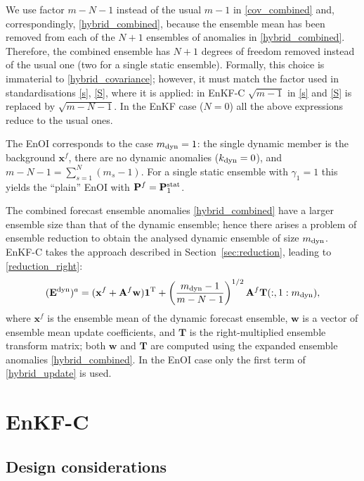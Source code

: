 \documentclass[11pt]{report}
\newcommand{\mb} {\mathbf}
\newcommand{\T}{^{\tiny \mathrm T}}
\newcommand*\suptxt[1]{^{\textnormal{#1}}}
\newcommand*\subtxt[1]{_{\textnormal{#1}}}
\begin{document}
We use factor $m - N - 1$ instead of the usual $m - 1$ in \eqref{cov_combined} and, correspondingly, \eqref{hybrid_combined}, because the ensemble mean has been removed from each of the $N + 1$ ensembles of anomalies in \eqref{hybrid_combined}.
Therefore, the combined ensemble has $N + 1$ degrees of freedom removed instead of the usual one (two for a single static ensemble).
Formally, this choice is immaterial to \eqref{hybrid_covariance}; however, it must match the factor used in standardisations \eqref{s}, \eqref{S}, where it is applied: in EnKF-C $\sqrt{m - 1}$ in \eqref{s} and \eqref{S} is replaced by $\sqrt{m - N - 1}$.
In the EnKF case ($N = 0$) all the above expressions reduce to the usual ones.

The EnOI corresponds to the case $m\subtxt{dyn} = 1$: the single dynamic member is the background $\mb x^f$, there are no dynamic anomalies ($k\subtxt{dyn} = 0$), and $m - N - 1 = \sum_{s=1}^N (m_s - 1)$.
For a single static ensemble with $\gamma_1 = 1$ this yields the ``plain'' EnOI with $\mb P^f = \mb P\suptxt{stat}_1$.

The combined forecast ensemble anomalies \eqref{hybrid_combined} have a larger ensemble size than that of the dynamic ensemble; hence there arises a problem of ensemble reduction to obtain the analysed dynamic ensemble of size $m\subtxt{dyn}$.
EnKF-C takes the approach described in Section~\ref{sec:reduction}, leading to \eqref{reduction_right}:
\begin{align}
  \label{hybrid_update}
  (\mb E\suptxt{dyn})^a = (\mb x^f + \mb A^f \mb w) \mb 1\T + \left(\frac{m\subtxt{dyn} - 1}{m - N - 1}\right)^{1/2} \mb A^f \mb T(:, 1 : m\subtxt{dyn}),
\end{align}
where $\mb x^f$ is the ensemble mean of the dynamic forecast ensemble, $\mb w$ is a vector of ensemble mean update coefficients, and $\mb T$ is the right-multiplied ensemble transform matrix; both $\mb w$ and $\mb T$ are computed using the expanded ensemble anomalies \eqref{hybrid_combined}.
In the EnOI case only the first term of \eqref{hybrid_update} is used.

\chapter{EnKF-C}
\label{ch:enkf-c}

\section{Design considerations}
\end{document}
